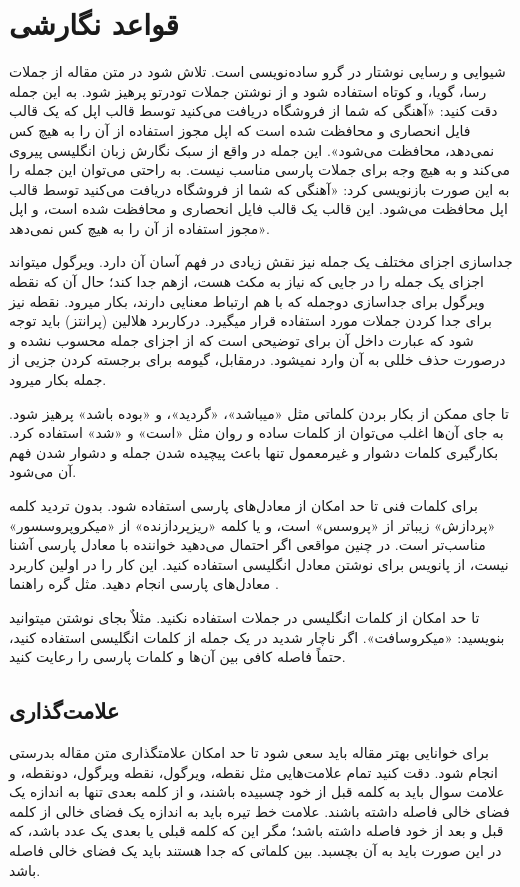 \documentclass{CCI2020}
\begin{document}
\section{قواعد نگارشی}

شیوایی و رسایی نوشتار در گرو ساده‌نویسی است. تلاش شود در متن مقاله از جملات رسا، گویا، و کوتاه استفاده شود و از نوشتن جملات تودرتو پرهیز شود. به این جمله دقت کنید: «آهنگی که شما از فروشگاه
 دریافت می‌کنید توسط قالب
 اپل که یک قالب فایل 
  انحصاری و محافظت شده است که اپل مجوز استفاده از آن را به هیچ کس نمی‌دهد، محافظت می‌شود». این جمله در واقع از سبک نگارش زبان انگلیسی پیروی می‌کند و به هیچ وجه برای جملات پارسی مناسب نیست. به راحتی می‌توان این جمله را به این صورت بازنویسی کرد: «آهنگی که شما از فروشگاه 
 دریافت می‌کنید توسط قالب
   اپل محافظت می‌شود. این قالب یک قالب فایل
 انحصاری و محافظت شده است، و اپل مجوز استفاده از آن را به هیچ کس نمی‌دهد».

جداسازی اجزای مختلف یک جمله نیز نقش زیادی در فهم آسان آن دارد. ویرگول می­تواند اجزای یک جمله را در جایی که نیاز به مکث هست، ازهم جدا کند؛ حال آن که نقطه ویرگول برای جداسازی دوجمله که با هم ارتباط معنایی دارند، بکار می­رود. نقطه نیز برای جدا کردن جملات مورد استفاده قرار می­گیرد. درکاربرد هلالین (پرانتز) باید توجه شود که عبارت داخل آن برای توضیحی است که از اجزای جمله محسوب نشده و درصورت حذف خللی به آن وارد نمی­شود. درمقابل، گیومه برای برجسته کردن جزیی از جمله بکار می­رود.

تا جای ممکن از بکار بردن کلماتی مثل «می­باشد»، «گردید»، و «بوده باشد» پرهیز شود. به جای آن‌ها اغلب می‌توان از کلمات ساده و روان مثل «است» و «شد» استفاده کرد. بکارگیری کلمات دشوار و غیرمعمول تنها باعث پیچیده شدن جمله و دشوار شدن فهم آن می‌شود.

برای کلمات فنی تا حد امکان از معادل‌های پارسی استفاده شود. بدون تردید کلمه «پردازش» زیباتر از «پروسس» است، و یا کلمه «ریزپردازنده» از «میکروپروسسور» مناسب‌تر است. در چنین مواقعی اگر احتمال می‌دهید خواننده با معادل پارسی آشنا نیست، از پانویس برای نوشتن معادل انگلیسی استفاده کنید. این کار را در اولین کاربرد معادل‌های پارسی انجام دهید. مثل گره راهنما
.

تا حد امکان از کلمات انگلیسی در جملات استفاده نکنید. مثلاٌ بجای نوشتن
 می­توانید بنویسید: «میکروسافت». اگر ناچار شدید در یک جمله از کلمات انگلیسی استفاده کنید، حتماً فاصله کافی بین آن‌ها و کلمات پارسی را رعایت کنید.

\subsection{علامت‌گذاری}
برای خوانایی بهتر مقاله باید سعی شود تا حد امکان علامت­گذاری متن مقاله بدرستی انجام شود. دقت کنید تمام علامت‌هایی مثل نقطه، ویرگول، نقطه ویرگول، دونقطه، و علامت سوال باید به کلمه قبل از خود چسبیده باشند، و از کلمه بعدی تنها به اندازه یک فضای خالی فاصله داشته باشند. علامت خط تیره باید به اندازه یک فضای خالی از کلمه قبل و بعد از خود فاصله داشته باشد؛ مگر این که کلمه قبلی یا بعدی یک عدد باشد، که در این صورت باید به آن بچسبد. بین کلماتی که جدا هستند باید یک فضای خالی فاصله باشد.
\end{document}
